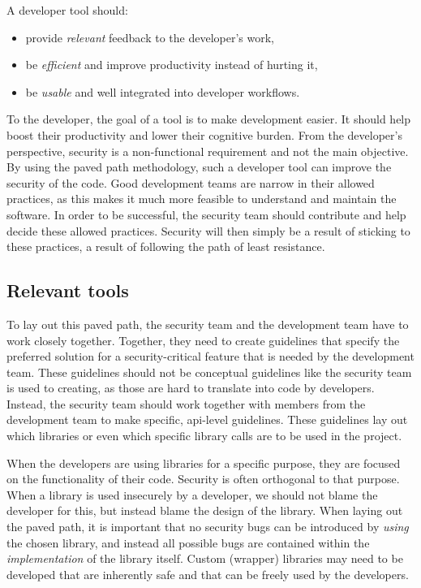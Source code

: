 A developer tool should:
\begin{itemize}[noitemsep]
    \item provide \emph{relevant} feedback to the developer's work,
    \item be \emph{efficient} and improve productivity instead of hurting it,
    \item be \emph{usable} and well integrated into developer workflows.
\end{itemize}

To the developer, the goal of a tool is to make development easier.
It should help boost their productivity and lower their cognitive burden.
From the developer's perspective, security is a non-functional requirement and not the main objective.
By using the paved path methodology, such a developer tool can improve the security of the code.
Good development teams are narrow in their allowed practices, as this makes it much more feasible to understand and maintain the software.
In order to be successful, the security team should contribute and help decide these allowed practices.
Security will then simply be a result of sticking to these practices, a result of following the path of least resistance.

\subsection{Relevant tools}
To lay out this paved path, the security team and the development team have to work closely together.
Together, they need to create guidelines that specify the preferred solution for a security-critical feature that is needed by the development team.
These guidelines should not be conceptual guidelines like the security team is used to creating, as those are hard to translate into code by developers.
Instead, the security team should work together with members from the development team to make specific, \gls{api}-level guidelines.
These guidelines lay out which libraries or even which specific library calls are to be used in the project.

When the developers are using libraries for a specific purpose, they are focused on the functionality of their code. Security is often orthogonal to that purpose.
When a library is used insecurely by a developer, we should not blame the developer for this, but instead blame the design of the library.
When laying out the paved path, it is important that no security bugs can be introduced by \textit{using} the chosen library, and instead all possible bugs are contained within the \textit{implementation} of the library itself.
Custom (wrapper) libraries may need to be developed that are inherently safe and that can be freely used by the developers.

